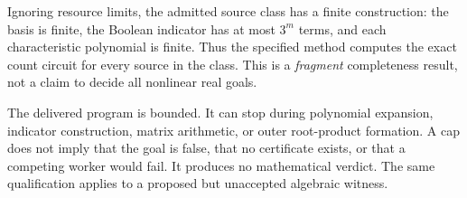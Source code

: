 Ignoring resource limits, the admitted source class has a finite construction: the basis is finite, the Boolean indicator has at most $3^m$ terms, and each characteristic polynomial is finite. Thus the specified method computes the exact count circuit for every source in the class. This is a \emph{fragment} completeness result, not a claim to decide all nonlinear real goals.

The delivered program is bounded. It can stop during polynomial expansion, indicator construction, matrix arithmetic, or outer root-product formation. A cap does not imply that the goal is false, that no certificate exists, or that a competing worker would fail. It produces no mathematical verdict. The same qualification applies to a proposed but unaccepted algebraic witness.
